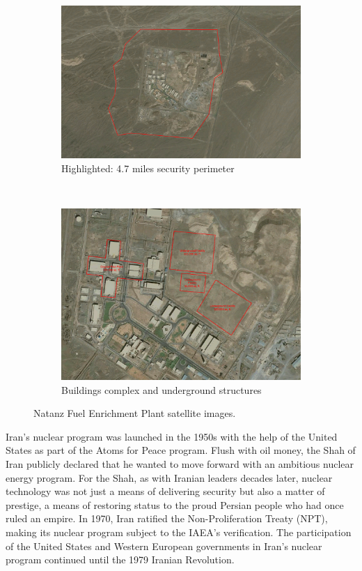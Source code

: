 \documentclass[12pt]{article}
\begin{document}
\begin{figure}[ht!]
    \centering
    \begin{subfigure}[t]{0.5\textwidth}
        \centering
        \includegraphics[height=0.65\textwidth]{natanz1.jpg}
        \caption{Highlighted: 4.7 miles security perimeter}
    \end{subfigure}%
    ~ 
    \begin{subfigure}[t]{0.5\textwidth}
        \centering
        \includegraphics[height=0.65\textwidth]{natanz2.jpg}
        \caption{Buildings complex and underground structures}
    \end{subfigure}
    \caption{Natanz Fuel Enrichment Plant satellite images. \cite{pubirannuclearsite}}
\end{figure}

Iran's nuclear program was launched in the 1950s with the help of the United States as part of the Atoms for Peace program. Flush with oil money, the Shah of Iran publicly declared that he wanted to move forward with an ambitious nuclear energy program. For the Shah, as with Iranian leaders decades later, nuclear technology was not just a means of delivering security but also a matter of prestige, a means of restoring status to the proud Persian people who had once ruled an empire.  
In 1970, Iran ratified the Non-Proliferation Treaty (NPT), making its nuclear program subject to the IAEA's verification. The participation of the United States and Western European governments in Iran's nuclear program continued until the 1979 Iranian Revolution.
\end{document}

